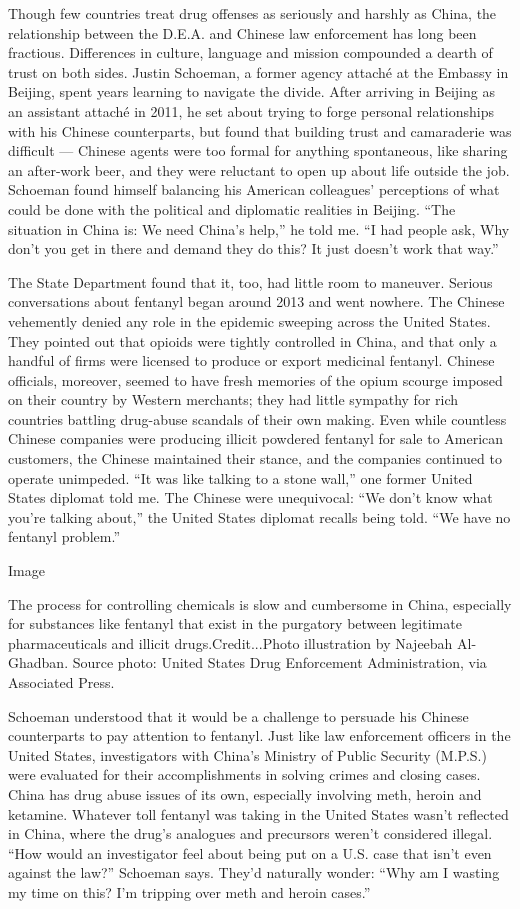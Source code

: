 Though few countries treat drug offenses as seriously and harshly as
China, the relationship between the D.E.A. and Chinese law enforcement
has long been fractious. Differences in culture, language and mission
compounded a dearth of trust on both sides. Justin Schoeman, a former
agency attaché at the Embassy in Beijing, spent years learning to
navigate the divide. After arriving in Beijing as an assistant attaché
in 2011, he set about trying to forge personal relationships with his
Chinese counterparts, but found that building trust and camaraderie was
difficult --- Chinese agents were too formal for anything spontaneous,
like sharing an after-work beer, and they were reluctant to open up
about life outside the job. Schoeman found himself balancing his
American colleagues' perceptions of what could be done with the
political and diplomatic realities in Beijing. ``The situation in China
is: We need China's help,'' he told me. ``I had people ask, Why don't
you get in there and demand they do this? It just doesn't work that
way.''

The State Department found that it, too, had little room to maneuver.
Serious conversations about fentanyl began around 2013 and went nowhere.
The Chinese vehemently denied any role in the epidemic sweeping across
the United States. They pointed out that opioids were tightly controlled
in China, and that only a handful of firms were licensed to produce or
export medicinal fentanyl. Chinese officials, moreover, seemed to have
fresh memories of the opium scourge imposed on their country by Western
merchants; they had little sympathy for rich countries battling
drug-abuse scandals of their own making. Even while countless Chinese
companies were producing illicit powdered fentanyl for sale to American
customers, the Chinese maintained their stance, and the companies
continued to operate unimpeded. ``It was like talking to a stone wall,''
one former United States diplomat told me. The Chinese were unequivocal:
``We don't know what you're talking about,'' the United States diplomat
recalls being told. ``We have no fentanyl problem.''

Image

The process for controlling chemicals is slow and cumbersome in China,
especially for substances like fentanyl that exist in the purgatory
between legitimate pharmaceuticals and illicit drugs.Credit...Photo
illustration by Najeebah Al-Ghadban. Source photo: United States Drug
Enforcement Administration, via Associated Press.

Schoeman understood that it would be a challenge to persuade his Chinese
counterparts to pay attention to fentanyl. Just like law enforcement
officers in the United States, investigators with China's Ministry of
Public Security (M.P.S.) were evaluated for their accomplishments in
solving crimes and closing cases. China has drug abuse issues of its
own, especially involving meth, heroin and ketamine. Whatever toll
fentanyl was taking in the United States wasn't reflected in China,
where the drug's analogues and precursors weren't considered illegal.
``How would an investigator feel about being put on a U.S. case that
isn't even against the law?'' Schoeman says. They'd naturally wonder:
``Why am I wasting my time on this? I'm tripping over meth and heroin
cases.''

